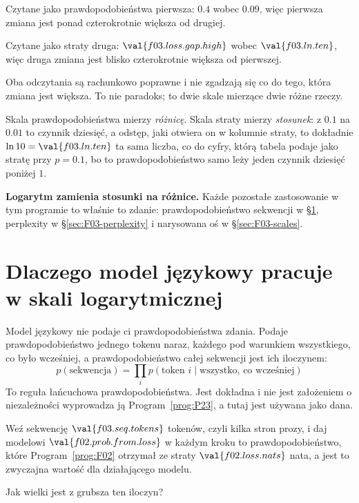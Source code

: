 \begin{fr}
\begin{ansblock}
Czytane jako prawdopodobieństwa \dash{} pierwsza: $\num{0.4}$ wobec
$\num{0.09}$, więc pierwsza zmiana jest ponad czterokrotnie większa od drugiej.

Czytane jako straty \dash{} druga: $\val{f03.loss.gap.high}$ wobec
$\val{f03.ln.ten}$, więc druga zmiana jest blisko czterokrotnie większa od
pierwszej.

Oba odczytania są rachunkowo poprawne i nie zgadzają się co do tego, która
zmiana jest większa. To nie paradoks; to dwie skale mierzące dwie różne
rzeczy.
\end{ansblock}

Skala prawdopodobieństwa mierzy \emph{różnicę}. Skala straty mierzy
\emph{stosunek}: z $\num{0.1}$ na $\num{0.01}$ to czynnik dziesięć, a odstęp,
jaki otwiera on w kolumnie straty, to dokładnie $\ln 10 = \val{f03.ln.ten}$
\dash{} ta sama liczba, co do cyfry, którą tabela podaje jako stratę przy
$p = \num{0.1}$, bo to prawdopodobieństwo samo leży jeden czynnik dziesięć
poniżej $1$.

\textbf{Logarytm zamienia stosunki na różnice.} Każde pozostałe zastosowanie w
tym programie to właśnie to zdanie: prawdopodobieństwo sekwencji w
\S\ref{sec:F03-logspace}, perplexity w \S\ref{sec:F03-perplexity} i narysowana
oś w \S\ref{sec:F03-scales}.
\end{fr}

\section{Dlaczego model językowy pracuje w skali logarytmicznej}
\label{sec:F03-logspace}

\begin{fr}
Model językowy nie podaje ci prawdopodobieństwa zdania. Podaje
prawdopodobieństwo jednego tokenu naraz, każdego pod warunkiem wszystkiego, co
było wcześniej, a prawdopodobieństwo całej sekwencji jest ich iloczynem:
\[ p(\text{sekwencja})
   = \prod_{i} p(\text{token } i \mid \text{wszystko, co wcześniej}) \]
To reguła łańcuchowa prawdopodobieństwa. Jest dokładna i nie jest założeniem o
niezależności \dash{} wyprowadza ją Program~\ref{prog:P23}, a tutaj jest
używana jako dana.

Weź sekwencję $\val{f03.seq.tokens}$ tokenów, czyli kilka stron prozy, i daj
modelowi $\val{f02.prob.from.loss}$ w każdym kroku \dash{} to
prawdopodobieństwo, które Program~\ref{prog:F02} otrzymał ze straty
$\val{f02.loss.nats}$ nata, a jest to zwyczajna wartość dla działającego
modelu.

Jak wielki jest z grubsza ten iloczyn?
\nextframe
\end{fr}

